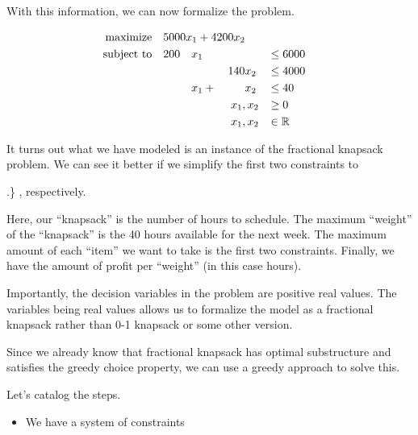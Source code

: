 \documentclass[12pt,letterpaper]{article}
\begin{document}
\begin{enumerate}
      With this information, we can now formalize the problem.

      \begin{alignat*}{7}
        \text{maximize}   \quad \rlap{$5000 x_1 + 4200 x_2$}                                        \\
        \text{subject to} \quad & 200 & x_1 &       &     &                   && \leq 6000          \\
                                &     &     &       & 140 & x_2               && \leq 4000          \\
                                &     & x_1 & {}+{} &     & x_2               && \leq 40            \\
                                &     &     &       &     & \clap{$x_1, x_2$} && \geq 0             \\
                                &     &     &       &     & \clap{$x_1, x_2$} && \in  \mathbb{R}    \\
      \end{alignat*}

      It turns out what we have modeled is an instance of the fractional knapsack problem.
      We can see it better if we simplify the first two constraints to

      \sysdelim.\}
      , respectively.

      Here, our ``knapsack'' is the number of hours to schedule.
      The maximum ``weight'' of the ``knapsack'' is the 40 hours available for the next week.
      The maximum amount of each ``item'' we want to take is the first two constraints.
      Finally, we have the amount of profit per ``weight'' (in this case hours).

      Importantly, the decision variables in the problem are positive real values.
      The variables being real values allows us to formalize the model as a fractional knapsack rather than 0-1 knapsack or some other version.

      Since we already know that fractional knapsack has optimal substructure and
      satisfies the greedy choice property,
      we can use a greedy approach to solve this.

      Let's catalog the steps.

      \begin{itemize}
        \item
          We have a system of constraints


\end{itemize}
\end{enumerate}
\end{document}
